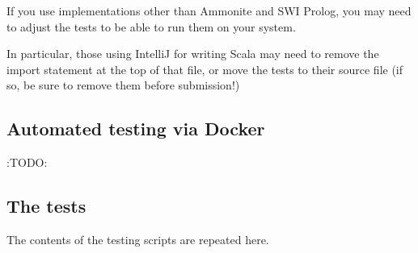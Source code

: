 \documentclass[11pt]{article}
\begin{document}
If you use implementations other than Ammonite and SWI Prolog,
you may need to adjust the tests to be able to run them
on your system.

In particular, those using IntelliJ for writing Scala
may need to remove the import statement at the top of that file,
or move the tests to their source file
(if so, be sure to remove them before submission!)

\subsection*{Automated testing via Docker}
\label{sec:org292ec07}
:TODO:

\subsection*{The tests}
\label{sec:orgc9efe1d}
The contents of the testing scripts are repeated here.
\end{document}
